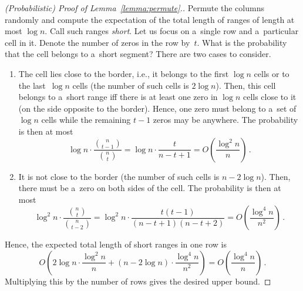 \documentclass[11pt,letterpaper]{article}
\begin{document}
\begin{proof}[(Probabilistic) Proof of Lemma~\ref{lemma:permute}.]
Permute the columns randomly and compute the expectation of
the total length of ranges of length at most $\log n$. Call such ranges \emph{short}. Let us focus on a~single row and a~particular cell in it. Denote the number of zeros in the row by~$t$. What is the probability that the cell belongs to a~short segment? There are two cases to consider.
\begin{enumerate}
\item The cell lies close to the border, i.e., it belongs to
the first $\log n$ cells or to the last~$\log n$ cells
(the number of such cells is $2\log n$). Then,
this cell belongs to a~short range iff there is at least one zero
in $\log n$ cells close to it (on the side opposite to the border).
Hence, one zero must belong to a~set of $\log n$ cells while the remaining $t-1$ zeros may be anywhere.
The probability is then at most
\[\log n \cdot \frac{\binom{n}{t-1}}{\binom{n}{t}}=\log n \cdot \frac{t}{n-t+1}=O\left(\frac{\log^2n}{n}\right) \, .\]
\item It is not close to the border (the number of such cells is $n-2\log n$). Then, there must be a~zero on both sides of the
cell. The probability is then at most
\[\log^2 n \cdot \frac{\binom{n}{t}}{\binom{n}{t-2}}=\log^2n \cdot \frac{t(t-1)}{(n-t+1)(n-t+2)}=O\left(\frac{\log^4 n}{n^2}\right) \, .\]
\end{enumerate}
Hence, the expected total length of short ranges in one row is
\[O\left( 2\log n \cdot \frac{\log^2 n}{n} + (n-2\log n) \cdot \frac{\log^4 n}{n^2}\right)=O\left(\frac{\log^4 n}{n}\right) \, .\]
Multiplying this by the number of rows gives the desired upper bound.
\end{proof}
\end{document}
